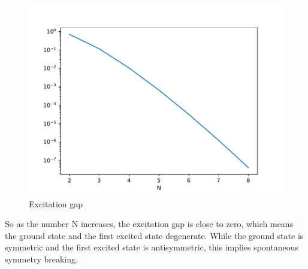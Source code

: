 \begin{figure}[h]
    \centering
    \includegraphics[width=.8\textwidth]{gap.pdf}
    \caption{Excitation gap}
    \label{3.9 fig gap}
\end{figure}

So as the number N increases, the excitation gap is close to zero, which means the ground state and the first excited state degenerate. While the ground state is symmetric and the first excited state is antisymmetric, this implies spontaneous symmetry breaking.